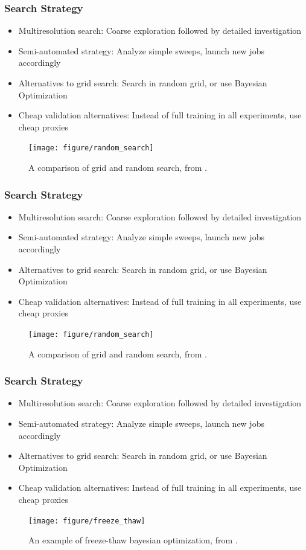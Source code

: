 \documentclass[10pt,mathserif]{beamer}
\begin{document}
\begin{frame}
  \frametitle{Search Strategy}
  \begin{itemize}
  \item Multiresolution search: Coarse exploration followed by detailed
    investigation
  \item Semi-automated strategy: Analyze simple sweeps, launch new jobs
    accordingly
  \item Alternatives to grid search: Search in random grid, or use Bayesian
    Optimization
  \item Cheap validation alternatives: Instead of full training in all
    experiments, use cheap proxies
  \end{itemize}
  \begin{figure}[ht]
    \centering
    \texttt{[image: figure/random\_search]}
    \caption{A comparison of grid and random search, from
      \citep{bergstra2012random}. \label{fig:random_search} }
  \end{figure}
\end{frame}

\begin{frame}
  \frametitle{Search Strategy}
  \begin{itemize}
  \item Multiresolution search: Coarse exploration followed by detailed
    investigation
  \item Semi-automated strategy: Analyze simple sweeps, launch new jobs
    accordingly
  \item Alternatives to grid search: Search in random grid, or use Bayesian
    Optimization
  \item Cheap validation alternatives: Instead of full training in all
    experiments, use cheap proxies
  \end{itemize}
  \begin{figure}[ht]
    \centering
    \texttt{[image: figure/random\_search]}
    \caption{A comparison of grid and random search, from
      \citep{bergstra2012random}. \label{fig:random_search} }
  \end{figure}
\end{frame}

\begin{frame}
  \frametitle{Search Strategy}
  \begin{itemize}
  \item Multiresolution search: Coarse exploration followed by detailed
    investigation
  \item Semi-automated strategy: Analyze simple sweeps, launch new jobs
    accordingly
  \item Alternatives to grid search: Search in random grid, or use Bayesian
    Optimization
  \item Cheap validation alternatives: Instead of full training in all
    experiments, use cheap proxies
  \end{itemize}
  \begin{figure}[ht]
    \centering
    \texttt{[image: figure/freeze\_thaw]}
    \caption{An example of freeze-thaw bayesian optimization, from 
      \citep{swersky2014freeze}. \label{fig:random_search} }
  \end{figure}
\end{frame}
\end{document}
